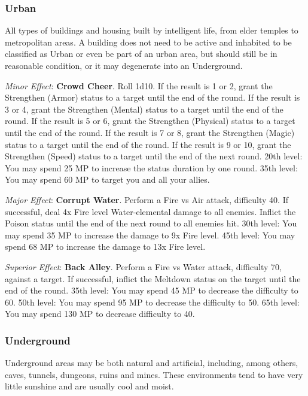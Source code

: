 \begin{multicols}{2}
    \subsubsection{Urban}

    All types of buildings and housing built by intelligent life, from elder temples to metropolitan areas. A building does not need to be active and inhabited to be classified as Urban or even be part of an urban area, but should still be in reasonable condition, or it may degenerate into an Underground.

	\textit{Minor Effect}: \textbf{Crowd Cheer}. Roll 1d10. If the result is 1 or 2, grant the Strengthen (Armor) status to a target until the end of the round. If the result is 3 or 4, grant the Strengthen (Mental) status to a target until the end of the round. If the result is 5 or 6, grant the Strengthen (Physical) status to a target until the end of the round. If the result is 7 or 8, grant the Strengthen (Magic) status to a target until the end of the round. If the result is 9 or 10, grant the Strengthen (Speed) status to a target until the end of the next round. 20th level: You may spend 25 MP to increase the status duration by one round. 35th level: You may spend 60 MP to target you and all your allies.

	\textit{Major Effect}: \textbf{Corrupt Water}. Perform a Fire vs Air attack, difficulty 40. If successful, deal 4x Fire level Water-elemental damage to all enemies. Inflict the Poison status until the end of the next round to all enemies hit. 30th level: You may spend 35 MP to increase the damage to 9x Fire level. 45th level: You may spend 68 MP to increase the damage to 13x Fire level.

	\textit{Superior Effect}: \textbf{Back Alley}. Perform a Fire vs Water attack, difficulty 70, against a target. If successful, inflict the Meltdown status on the target until the end of the round. 35th level: You may spend 45 MP to decrease the difficulty to 60. 50th level: You may spend 95 MP to decrease the difficulty to 50. 65th level: You may spend 130 MP to decrease difficulty to 40.

    \subsubsection{Underground}

    Underground areas may be both natural and artificial, including, among others, caves, tunnels, dungeons, ruins and mines. These environments tend to have very little sunshine and are usually cool and moist.


\end{multicols}
